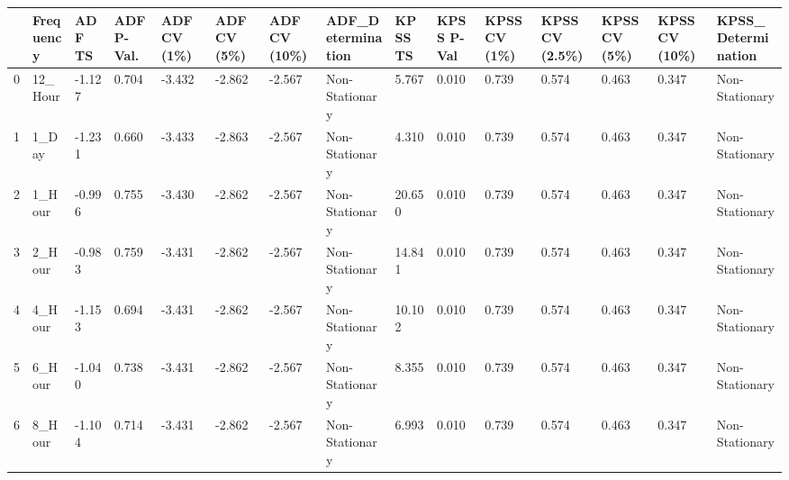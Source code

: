 \begin{tabular}{lllllllllllllll}
\toprule
 & Frequency & ADF TS & ADF P-Val. & ADF CV (1\%) & ADF CV (5\%) & ADF CV (10\%) & ADF_Determination & KPSS TS & KPSS P-Val & KPSS CV (1\%) & KPSS CV (2.5\%) & KPSS CV (5\%) & KPSS CV (10\%) & KPSS_Determination \\
\midrule
0 & 12_Hour & -1.127 & 0.704 & -3.432 & -2.862 & -2.567 & Non-Stationary & 5.767 & 0.010 & 0.739 & 0.574 & 0.463 & 0.347 & Non-Stationary \\
1 & 1_Day & -1.231 & 0.660 & -3.433 & -2.863 & -2.567 & Non-Stationary & 4.310 & 0.010 & 0.739 & 0.574 & 0.463 & 0.347 & Non-Stationary \\
2 & 1_Hour & -0.996 & 0.755 & -3.430 & -2.862 & -2.567 & Non-Stationary & 20.650 & 0.010 & 0.739 & 0.574 & 0.463 & 0.347 & Non-Stationary \\
3 & 2_Hour & -0.983 & 0.759 & -3.431 & -2.862 & -2.567 & Non-Stationary & 14.841 & 0.010 & 0.739 & 0.574 & 0.463 & 0.347 & Non-Stationary \\
4 & 4_Hour & -1.153 & 0.694 & -3.431 & -2.862 & -2.567 & Non-Stationary & 10.102 & 0.010 & 0.739 & 0.574 & 0.463 & 0.347 & Non-Stationary \\
5 & 6_Hour & -1.040 & 0.738 & -3.431 & -2.862 & -2.567 & Non-Stationary & 8.355 & 0.010 & 0.739 & 0.574 & 0.463 & 0.347 & Non-Stationary \\
6 & 8_Hour & -1.104 & 0.714 & -3.431 & -2.862 & -2.567 & Non-Stationary & 6.993 & 0.010 & 0.739 & 0.574 & 0.463 & 0.347 & Non-Stationary \\
\bottomrule
\end{tabular}
